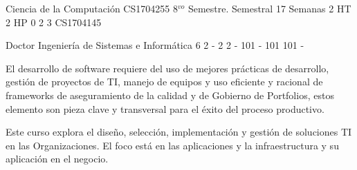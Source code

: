 \documentclass[a4paper,8pt]{article}
\begin{document}
\setNombreProfesor{}
\setGradoProfesorAbreviado{}
\sylabusHeader

\academicaTable
{Ciencia de la Computación} %
{CS1704255} %
{8$^{vo}$ Semestre.} %
{Semestral} %
{17 Semanas} %
{2 HT} %
{2 HP} %
{0} %
{}  %
{2} %
{3} %
{CS1704145} %

\administrativaTable
{Doctor} %
{Ingeniería de Sistemas e Informática} %
{6} %
{2} %
{-} %
{2} %
{2} %
{-} %
{101} %
{-} %
{101} %
{101} %
{-} %


\begin{fundamentacion}
El desarrollo de software requiere del uso de mejores prácticas de desarrollo, gestión de proyectos de TI, manejo de equipos
y uso eficiente y racional de frameworks de aseguramiento de la calidad y de Gobierno de Portfolios, estos elemento son pieza 
clave y transversal para el éxito del proceso productivo.

Este curso explora el diseño, selección, implementación y gestión de soluciones TI en las Organizaciones. El foco está en 
las aplicaciones y la infraestructura y su aplicación en el negocio.

\end{fundamentacion}

\begin{sumilla}
\item \SESoftwareDesign
\item \SESoftwareProjectManagement
\item 
\item 

\end{sumilla}

\begin{competenciasAsignatura}
\item {}
\item {}
\item {}
\item {}
\item {}
\item {}
\item {}
\item {}
\item {}
\item {}

\end{competenciasAsignatura}
\end{document}
